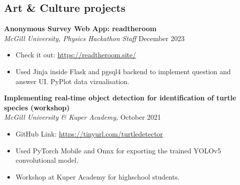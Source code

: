 \documentclass{article}
\newcommand{\cvsection}[1]{\section*{\rmfamily#1}}
\begin{document}
\begin{samepage}
\cvsection{Art \& Culture projects}
\indent

\textbf{Anonymous Survey Web App: readtheroom}\\
\indent
\textit{McGill University, Physics Hackathon Staff } \hfill December 2023
\begin{itemize}
    \item[] Check it out: \url{https://readtheroom.site/}
    \item[] Used Jinja inside Flask and pgsql4 backend to implement question and answer UI. PyPlot data vizualisation.
\end{itemize}

\textbf{Implementing real-time object detection for identification of turtle species (workshop)}\\
\indent
\textit{McGill University \& Kuper Academy, } \hfill October 2021
\begin{itemize}
    \item[] GitHub Link: \url{https://tinyurl.com/turtledetector}
    \item[] Used PyTorch Mobile and Onnx for exporting the trained YOLOv5 convolutional model.
    \item[] Workshop at Kuper Academy for highschool students.
\end{itemize}
\end{samepage}







\end{document}
